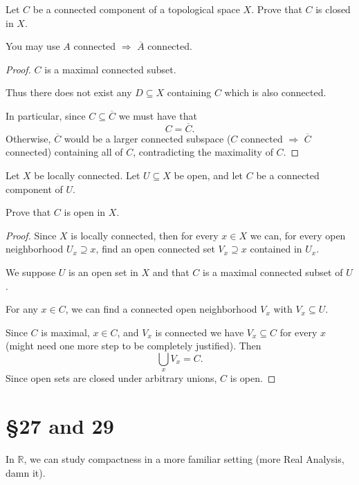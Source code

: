 \documentclass[11pt]{article}
\begin{document}
\begin{prob}
    Let $C$ be a connected component of a topological 
    space $X$. Prove that $C$ is closed in $X$. 

    You may use $A$ connected 
    $\Rightarrow$ $\overline A$ connected. 
\end{prob}
\begin{proof}
    $C$ is a maximal connected subset. 

    Thus there does not exist any 
    $D \subseteq X$ containing $C$ which is also connected. 
    
    In particular, since $C \subseteq \overline C$ 
    we must have that 
    \[
        C = \overline C. 
    \]
    Otherwise, $\overline C$ would be a larger connected 
    subspace ($C$ connected $\Rightarrow$ 
    $\overline C$ connected) containing all of $C$,  
    contradicting the maximality of $C$. 
\end{proof}

\begin{prob}
    Let $X$ be locally connected. Let $U \subseteq X$ 
    be open, and let $C$ be a connected component 
    of $U$. 

    Prove that $C$ is open in $X$. 
\end{prob}
\begin{proof}
    Since $X$ is locally connected, then for every  
    $x \in X$ we can, for every open 
    neighborhood $U_x \supseteq x$, find an open 
    connected set $V_x \supseteq x$ contained in $U_x$. 

    We suppose $U$ is an open set in $X$ and 
    that $C$ is a maximal connected subset of $U$. 

    For any $x \in C$, we can find a connected open 
    neighborhood 
    $V_x$ with $V_x \subseteq U$. 

    Since $C$ is maximal, $x \in C$, and $V_x$ is connected 
    we have $V_x \subseteq C$ for every $x$ (might 
    need one more step to be completely 
    justified). 
    Then 
    \[
        \bigcup_{x} V_x = C. 
    \]
    Since open sets are closed under arbitrary unions, 
    $C$ is open. 

\end{proof}
 

\section{\S 27 and 29} 

In $\mathbb R$, we can study compactness in a 
more familiar setting (more Real Analysis, damn it). 
\end{document}
